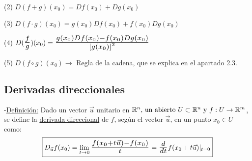 \documentclass[12pt, titlepage]{article}
\newcommand{\R}{\mathbb{R}}
\newcommand{\bfrac}[2]{\scalebox{1.4}{$\frac{#1}{#2}$}}
\newcommand{\definicion}{\noindent-\underline{Definición:} }
\begin{document}
(2) $D (f + g) (x_0) = Df (x_0) + Dg (x_0)$
\vspace{3mm}

(3) $D(f \cdot g) (x_0) = g (x_0) Df (x_0) + f (x_0) Dg (x_0)$
\vspace{3mm}

(4) $D (\bfrac{f}{g}) (x_0) = \bfrac{g (x_0) Df (x_0) - f (x_0) Dg (x_0)}{{[g (x_0)]}^2}$
\vspace{3mm}

(5) $D (f \circ g) (x_0) \rightarrow$ Regla de la cadena, que se explica en el apartado 2.3.
\vspace{7mm}

\subsection{Derivadas direccionales}

\definicion Dado un vector $\vec{u}$ unitario en $\R^n \text{, un abierto } U \subset \R^n \text{ y } \\
f : U \to \R^m$, se define la \underline{derivada direccional} de $f$, según el vector $\vec{u}$, en un punto 
$x_0 \in U$ como:
\[
\boxed{
D_{\vec{u}} f (x_0) = \displaystyle \lim_{t \to 0} \bfrac{f (x_0 + t \vec{u}) - f (x_0)}{t} = \bfrac{d}{dt} 
f (x_0 + t \vec{u}) |_{t = 0}
}
\]
\end{document}
